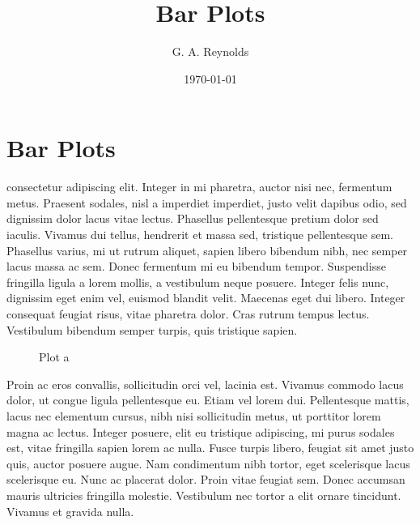 \documentclass{tufte-handout}
\title{Bar Plots}
\author{G. A. Reynolds}
\date{\today}
\begin{document}
\maketitle
\nocite{*}

\tableofcontents

\section{Bar Plots}







 consectetur adipiscing elit. Integer in mi pharetra, auctor nisi nec, fermentum metus. Praesent sodales, nisl a imperdiet imperdiet, justo velit dapibus odio, sed dignissim dolor lacus vitae lectus. Phasellus pellentesque pretium dolor sed iaculis. Vivamus dui tellus, hendrerit et massa sed, tristique pellentesque sem. Phasellus varius, mi ut rutrum aliquet, sapien libero bibendum nibh, nec semper lacus massa ac sem. Donec fermentum mi eu bibendum tempor. Suspendisse fringilla ligula a lorem mollis, a vestibulum neque posuere. Integer felis nunc, dignissim eget enim vel, euismod blandit velit. Maecenas eget dui libero. Integer consequat feugiat risus, vitae pharetra dolor. Cras rutrum tempus lectus. Vestibulum bibendum semper turpis, quis tristique sapien.


\begin{figure}[h!]
\caption{Plot a}
\end{figure}

Proin ac eros convallis, sollicitudin orci vel, lacinia est. Vivamus commodo lacus dolor, ut congue ligula pellentesque eu. Etiam vel lorem dui. Pellentesque mattis, lacus nec elementum cursus, nibh nisi sollicitudin metus, ut porttitor lorem magna ac lectus. Integer posuere, elit eu tristique adipiscing, mi purus sodales est, vitae fringilla sapien lorem ac nulla. Fusce turpis libero, feugiat sit amet justo quis, auctor posuere augue. Nam condimentum nibh tortor, eget scelerisque lacus scelerisque eu. Nunc ac placerat dolor. Proin vitae feugiat sem. Donec accumsan mauris ultricies fringilla molestie. Vestibulum nec tortor a elit ornare tincidunt. Vivamus et gravida nulla.
\end{document}
